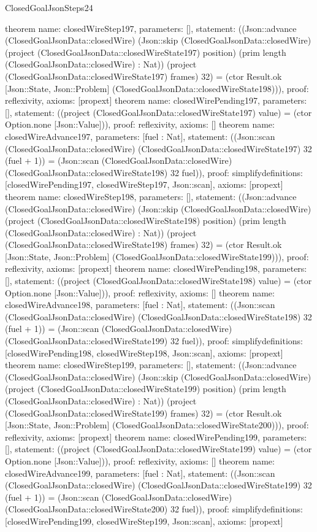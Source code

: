\begin{lexlean}{ClosedGoalJsonSteps24}
\begin{semanticmodule}
{}
theorem{
 name: closedWireStep197, parameters: [],
 statement: ((Json::advance (ClosedGoalJsonData::closedWire) (Json::skip (ClosedGoalJsonData::closedWire) (project (ClosedGoalJsonData::closedWireState197) position) (prim length (ClosedGoalJsonData::closedWire) : Nat)) (project (ClosedGoalJsonData::closedWireState197) frames) 32) = (ctor Result.ok [Json::State, Json::Problem] (ClosedGoalJsonData::closedWireState198))), proof: reflexivity{}, axioms: [propext]
}
theorem{
 name: closedWirePending197, parameters: [],
 statement: ((project (ClosedGoalJsonData::closedWireState197) value) = (ctor Option.none [Json::Value])), proof: reflexivity{}, axioms: []
}
theorem{
 name: closedWireAdvance197, parameters: [fuel : Nat],
 statement: ((Json::scan (ClosedGoalJsonData::closedWire) (ClosedGoalJsonData::closedWireState197) 32 (fuel + 1)) = (Json::scan (ClosedGoalJsonData::closedWire) (ClosedGoalJsonData::closedWireState198) 32 fuel)), proof: simplify{definitions: [closedWirePending197, closedWireStep197, Json::scan]}, axioms: [propext]
}
theorem{
 name: closedWireStep198, parameters: [],
 statement: ((Json::advance (ClosedGoalJsonData::closedWire) (Json::skip (ClosedGoalJsonData::closedWire) (project (ClosedGoalJsonData::closedWireState198) position) (prim length (ClosedGoalJsonData::closedWire) : Nat)) (project (ClosedGoalJsonData::closedWireState198) frames) 32) = (ctor Result.ok [Json::State, Json::Problem] (ClosedGoalJsonData::closedWireState199))), proof: reflexivity{}, axioms: [propext]
}
theorem{
 name: closedWirePending198, parameters: [],
 statement: ((project (ClosedGoalJsonData::closedWireState198) value) = (ctor Option.none [Json::Value])), proof: reflexivity{}, axioms: []
}
theorem{
 name: closedWireAdvance198, parameters: [fuel : Nat],
 statement: ((Json::scan (ClosedGoalJsonData::closedWire) (ClosedGoalJsonData::closedWireState198) 32 (fuel + 1)) = (Json::scan (ClosedGoalJsonData::closedWire) (ClosedGoalJsonData::closedWireState199) 32 fuel)), proof: simplify{definitions: [closedWirePending198, closedWireStep198, Json::scan]}, axioms: [propext]
}
theorem{
 name: closedWireStep199, parameters: [],
 statement: ((Json::advance (ClosedGoalJsonData::closedWire) (Json::skip (ClosedGoalJsonData::closedWire) (project (ClosedGoalJsonData::closedWireState199) position) (prim length (ClosedGoalJsonData::closedWire) : Nat)) (project (ClosedGoalJsonData::closedWireState199) frames) 32) = (ctor Result.ok [Json::State, Json::Problem] (ClosedGoalJsonData::closedWireState200))), proof: reflexivity{}, axioms: [propext]
}
theorem{
 name: closedWirePending199, parameters: [],
 statement: ((project (ClosedGoalJsonData::closedWireState199) value) = (ctor Option.none [Json::Value])), proof: reflexivity{}, axioms: []
}
theorem{
 name: closedWireAdvance199, parameters: [fuel : Nat],
 statement: ((Json::scan (ClosedGoalJsonData::closedWire) (ClosedGoalJsonData::closedWireState199) 32 (fuel + 1)) = (Json::scan (ClosedGoalJsonData::closedWire) (ClosedGoalJsonData::closedWireState200) 32 fuel)), proof: simplify{definitions: [closedWirePending199, closedWireStep199, Json::scan]}, axioms: [propext]
}
\end{semanticmodule}
\end{lexlean}
